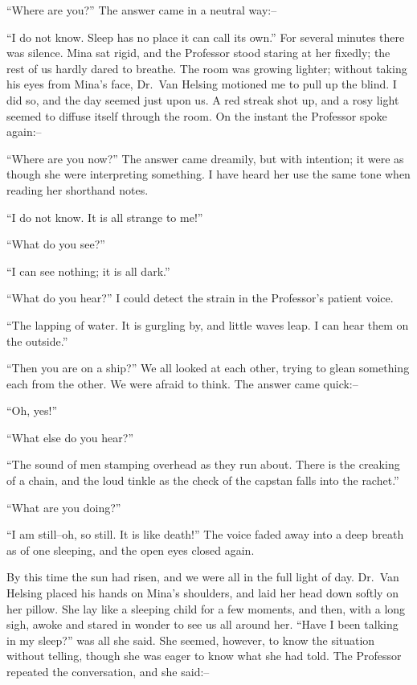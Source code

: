 \documentclass[12pt,openright]{book}
\begin{document}
“Where are you?” The answer came in a neutral way:–

“I do not know. Sleep has no place it can call its own.” For several minutes there was silence. Mina sat rigid, and the Professor stood staring at her fixedly; the rest of us hardly dared to breathe. The room was growing lighter; without taking his eyes from Mina’s face, Dr. Van Helsing motioned me to pull up the blind. I did so, and the day seemed just upon us. A red streak shot up, and a rosy light seemed to diffuse itself through the room. On the instant the Professor spoke again:–

“Where are you now?” The answer came dreamily, but with intention; it were as though she were interpreting something. I have heard her use the same tone when reading her shorthand notes.

“I do not know. It is all strange to me!”

“What do you see?”

“I can see nothing; it is all dark.”

“What do you hear?” I could detect the strain in the Professor’s patient voice.

“The lapping of water. It is gurgling by, and little waves leap. I can hear them on the outside.”

“Then you are on a ship?” We all looked at each other, trying to glean something each from the other. We were afraid to think. The answer came quick:–

“Oh, yes!”

“What else do you hear?”

“The sound of men stamping overhead as they run about. There is the creaking of a chain, and the loud tinkle as the check of the capstan falls into the rachet.”

“What are you doing?”

“I am still–oh, so still. It is like death!” The voice faded away into a deep breath as of one sleeping, and the open eyes closed again.

By this time the sun had risen, and we were all in the full light of day. Dr. Van Helsing placed his hands on Mina’s shoulders, and laid her head down softly on her pillow. She lay like a sleeping child for a few moments, and then, with a long sigh, awoke and stared in wonder to see us all around her. “Have I been talking in my sleep?” was all she said. She seemed, however, to know the situation without telling, though she was eager to know what she had told. The Professor repeated the conversation, and she said:–
\end{document}
